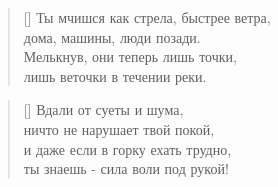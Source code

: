 \documentclass[a5paper,11pt]{memoir}
\begin{document}
\BgThispage

\clearpage

\begin{verse}[\versewidth]
Ты мчишся как стрела, быстрее ветра,\\
дома, машины, люди позади.\\
Мелькнув, они теперь лишь точки,\\
лишь веточки в течении реки.
\end{verse}

\begin{verse}[\versewidth]
Вдали от суеты и шума,\\
ничто не нарушает твой покой,\\
и даже если в горку ехать трудно,\\
ты знаешь - сила воли под рукой!
\end{verse}
\end{document}
